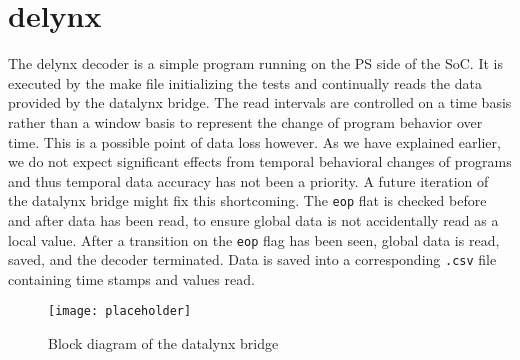 \documentclass[../bachelor_paper.tex]{subfiles}
\begin{document}
\section{delynx}
The delynx decoder is a simple program running on the \ac{PS} side of the \ac{SoC}. It is executed by the make file initializing the tests and continually reads the data provided by the datalynx bridge. The read intervals are controlled on a time basis rather than a window basis to represent the change of program behavior over time. This is a possible point of data loss however. As we have explained earlier, we do not expect significant effects from temporal behavioral changes of programs and thus temporal data accuracy has not been a priority. A future iteration of the datalynx bridge might fix this shortcoming. The \texttt{eop} flat is checked before and after data has been read, to ensure global data is not accidentally read as a local value. After a transition on the \texttt{eop} flag has been seen, global data is read, saved, and the decoder terminated. Data is saved into a corresponding \texttt{.csv} file containing time stamps and values read.

\begin{figure}
    \centering
    \texttt{[image: placeholder]}
    \caption{Block diagram of the datalynx bridge}
    \label{fig:arch/comm/block}
\end{figure}

\isstandalone



\fi
\end{document}
